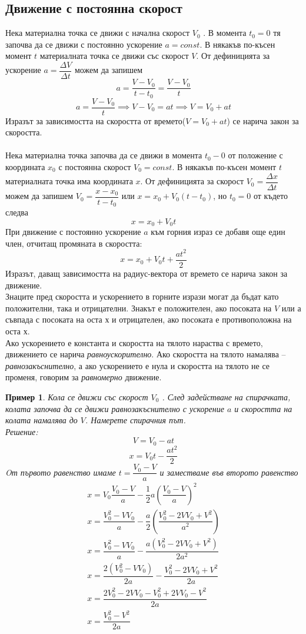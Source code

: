 \documentclass[fleqn, 12pt]{article}
\newtheorem{example}{Пример}[subsection]
\begin{document}
\subsection{Движение с постоянна скорост}
Нека материална точка се движи с начална скорост $V_0$ . В момента $t_0 = 0$ тя започва да се движи с постоянно ускорение $a = const$. В някакъв по-късен момент $t$ материалната точка се движи със скорост $V$. От дефиницията за ускорение  $ a =\dfrac{\Delta V}{\Delta t}$ можем да запишем 
$$a = \dfrac{V - V_0}{t - t_0} = \dfrac{V - V_0}{t}$$
$$a = \dfrac{V - V_0}{t} \implies V - V_0 = at \implies V = V_0 + at$$
Изразът за зависимостта на скоростта от времето($V = V_0 + at$) се нарича закон за скоростта. \\
\\
Нека материална точка започва да се движи в момента $t_0 - 0$ от положение с координата $x_0$ с постоянна скорост  $V_0 = const$. В някакъв по-късен момент $t$ материалната точка има координата $x$. От дефиницията за скорост  $V_0 = \dfrac{\Delta x}{\Delta t}$ можем да запишем $V_0 = \dfrac{x-x_0}{t - t_0}$ или $x = x_0 + V_0(t-t_0)$, но $t_0 = 0$ от където следва 
$$x = x_0 + V_0t$$
При движение с постоянно ускорение $a$ към горния израз се добавя още един член, отчитащ промяната в скоростта: 
$$x = x_0 + V_0t + \dfrac{at^2}{2}$$
Изразът, даващ зависимостта на радиус-вектора от времето се нарича закон за движение. \\
Знаците пред скоростта и ускорението в горните изрази могат да бъдат като положителни, така и отрицателни. Знакът е положителен, ако посоката на $V$ или а съвпада с посоката на оста х и отрицателен, ако посоката е противоположна на оста х.\\
Ако ускорението е константа и скоростта на тялото нараства с времето, движението се нарича \textit{равноускорително}. Ако скоростта на тялото намалява – \textit{равнозакъснително}, а ако ускорението е нула и скоростта на тялото не се променя, говорим за \textit{равномерно} движение.

\begin{example}
Кола се движи със скорост $V_0$ . След задействане на спирачката, колата започва да се движи равнозакъснително с ускорение $a$ и скоростта на колата намалява до $V$. Намерете спирачния път.\\
Решение:
$$V = V_0 - at$$
$$x = V_0t - \dfrac{at^2}{2}$$
Oт първото равенство имаме $t = \dfrac{V_0 - V}{a}$ и заместваме във второто равенство
\begin{gather*}
x = V_0 \dfrac{V_0 - V}{a} - \dfrac{1}{2}a \left( \dfrac{V_0 - V}{a}\right)^2 \\
x = \dfrac{V_0 ^2 - VV_0}{a} -  \dfrac{a}{2}  \left( \dfrac{V_0 ^2 - 2VV_0 + V^2}{a^2}\right)\\ 
x =\dfrac{V_0 ^2 - VV_0}{a} - \dfrac{a(V_0 ^2 - 2VV_0 + V^2)}{2a^2}\\
x = \dfrac{2(V_0 ^2 - VV_0)}{2a} - \dfrac{V_0 ^2 - 2VV_0 + V^2}{2a}\\
x = \dfrac{2V_0 ^2 - 2VV_0 - V_0 ^2 + 2VV_0 - V^2}{2a}\\
x = \dfrac{V_0 ^2 - V^2}{2a}
\end{gather*}
\end{example}
\end{document}
